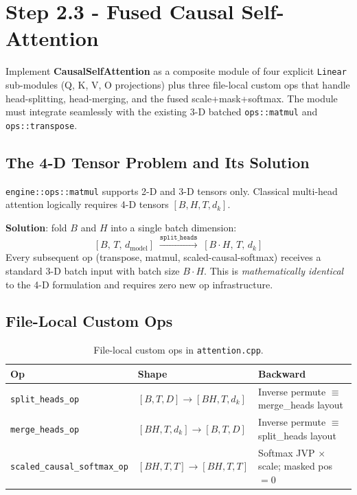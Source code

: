 \documentclass[12pt, a4paper]{article}
\begin{document}
\section{Step 2.3 - Fused Causal Self-Attention}

\begin{tcolorbox}[designbox, title={Step 2.3 Goal}]
  Implement \textbf{CausalSelfAttention} as a composite module of four
  explicit \texttt{Linear} sub-modules (Q, K, V, O projections) plus three
  file-local custom ops that handle head-splitting, head-merging, and the
  fused scale+mask+softmax.  The module must integrate seamlessly with the
  existing 3-D batched \texttt{ops::matmul} and \texttt{ops::transpose}.
\end{tcolorbox}

\subsection{The 4-D Tensor Problem and Its Solution}

\texttt{engine::ops::matmul} supports 2-D and 3-D tensors only.  Classical
multi-head attention logically requires 4-D tensors \([B, H, T, d_k]\).

\textbf{Solution}: fold \(B\) and \(H\) into a single batch dimension:
\[
  [B,\, T,\, d_{\text{model}}]
  \;\xrightarrow{\texttt{split\_heads}}\;
  [B \cdot H,\, T,\, d_k]
\]
Every subsequent op (transpose, matmul, scaled-causal-softmax) receives a
standard 3-D batch input with batch size \(B \cdot H\).  This is
\emph{mathematically identical} to the 4-D formulation and requires zero new
op infrastructure.

\subsection{File-Local Custom Ops}

\begin{table}[!ht]
\centering
\renewcommand{\arraystretch}{1.45}
\begin{tabularx}{\textwidth}{@{} l l L @{}}
\toprule
\textbf{Op} & \textbf{Shape} & \textbf{Backward} \\
\midrule
\texttt{split\_heads\_op}
  & \([B,T,D] \to [BH,T,d_k]\)
  & Inverse permute \(\equiv\) merge\_heads layout \\
\texttt{merge\_heads\_op}
  & \([BH,T,d_k] \to [B,T,D]\)
  & Inverse permute \(\equiv\) split\_heads layout \\
\texttt{scaled\_causal\_softmax\_op}
  & \([BH,T,T] \to [BH,T,T]\)
  & Softmax JVP \(\times\) scale; masked pos \(= 0\) \\
\bottomrule
\end{tabularx}
\caption{File-local custom ops in \texttt{attention.cpp}.}
\end{table}
\end{document}
